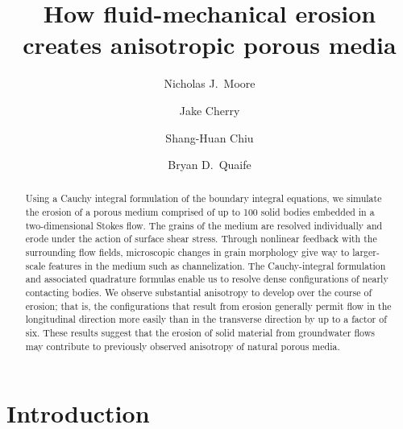 \documentclass[3p]{elsarticle}
\newcommand{\edit}[1]{{\color{red} #1}}
\begin{document}
\title{How fluid-mechanical erosion creates anisotropic porous media}



\author[Colgate]{Nicholas J.~Moore}

\author[FSU]{Jake Cherry}

\author[TAMU]{Shang-Huan Chiu}

\author[FSU]{Bryan D.~Quaife}

\address[Colgate]{Colgate University}
\address[FSU]{Florida State University}
\address[TAMU]{Texas A\&M-San Antonio}

\begin{abstract}
Using a Cauchy integral formulation of the boundary integral equations, we simulate the erosion of a porous medium comprised of up to 100 solid bodies embedded in a \edit{two-dimensional} Stokes flow. The grains of the medium are resolved individually and erode under the action of surface shear stress. Through nonlinear feedback with the surrounding flow fields, microscopic changes in grain morphology give way to larger-scale features in the medium such as channelization. The Cauchy-integral formulation and associated quadrature formulas enable us to resolve dense configurations of nearly contacting bodies.
We observe substantial anisotropy to develop over the course of erosion; that is, the configurations that result from erosion generally permit flow in the longitudinal direction more easily than in the transverse direction by up to a factor of six. These results suggest that the erosion of solid material from groundwater flows may contribute to previously observed anisotropy of natural porous media.
\end{abstract}
\maketitle



\section{Introduction}
\end{document}
